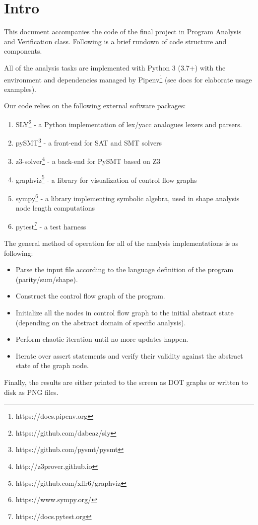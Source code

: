 \documentclass[12pt,a4paper]{article}
\begin{document}
	\section*{Intro}
	This document accompanies the code of the final project in Program Analysis and Verification class. Following is a brief rundown of code structure and components.
	
	All of the analysis tasks are implemented with Python 3 (3.7+) with the environment and dependencies managed by Pipenv\footnote{https://docs.pipenv.org} (see docs for elaborate usage examples).
	
	Our code relies on the following external software packages:
	\begin{enumerate}
		\item SLY\footnote{https://github.com/dabeaz/sly} - a Python implementation of lex/yacc analogues lexers and parsers.
		\item pySMT\footnote{https://github.com/pysmt/pysmt} - a front-end for SAT and SMT solvers
		\item z3-solver\footnote{http://z3prover.github.io} - a back-end for PySMT based on Z3
		\item graphviz\footnote{https://github.com/xflr6/graphviz} - a library for visualization of control flow graphs
		\item sympy\footnote{https://www.sympy.org/} - a library implementing symbolic algebra, used in shape analysis node length computations
		\item pytest\footnote{https://docs.pytest.org} - a test harness
	\end{enumerate}
The general method of operation for all of the analysis implementations is as following:
\begin{itemize}
	\item Parse the input file according to the language definition of the program (parity/sum/shape).
	\item Construct the control flow graph of the program.
	\item Initialize all the nodes in control flow graph to the initial abstract state (depending on the abstract domain of specific analysis).
	\item Perform chaotic iteration until no more updates happen.
	\item Iterate over assert statements and verify their validity against the abstract state of the graph node.
\end{itemize}
Finally, the results are either printed to the screen as DOT graphs or written to disk as PNG files.
\end{document}
